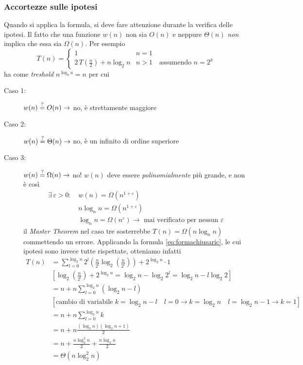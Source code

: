 \subsubsection{Accortezze sulle ipotesi}
Quando si applica la formula, si deve fare attenzione durante la verifica delle ipotesi.
Il fatto che una funzione $w(n)$ non sia $O(n)$ e neppure $\Theta(n)$ \textit{non} implica che essa sia $\Omega(n)$. Per esempio
\[
    T(n) = 
    \begin{cases} 
        1      &  n = 1 \\
        2 \, T\left(\frac{n}{2}\right) + n \log_2 n & n > 1 \quad \text{assumendo } n=2^k
    \end{cases}
\]
ha come \textit{treshold} $n^{\log_b a} = n$ per cui
\begin{description}
    \item[Caso 1:] $w(n) \overset{?}{=} O(n) \rightarrow $ no, è strettamente maggiore
    \item[Caso 2:] $w(n) \overset{?}{=} \Theta(n) \rightarrow $ no, è un infinito di ordine superiore
    \item[Caso 3:] $w(n) \overset{?}{=} \Omega(n) \rightarrow $
        no! $w(n)$ deve essere \textit{polinomialmente} più grande, e non è così
        \begin{align*}
            \exists \, \varepsilon > 0 :\, & w(n) = \Omega \left( n^{1+\varepsilon} \right) \\
            & n \log_n n = \Omega \left( n^{1+\varepsilon} \right) \\
            & \log_n n = \Omega \left( n^{\varepsilon} \right) \rightarrow
                \text{ mai verificato per nessun $\varepsilon$}
        \end{align*}
        il \textit{Master Theorem} nel caso tre sosterrebbe $T(n)=\Omega \left( n \log_n n \right)$
        commettendo un errore. Applicando la formula \ref{eq:formachiusaric}, le cui ipotesi sono invece tutte rispettate, otteniamo infatti
        \begin{align*}
            T(n) &= \sum_{l=0}^{\log_2 n} 2^l \left( \frac{n}{2^l} \log_2 \left( \frac{n}{2^l} \right) \right) + 2^{\log_2 n} \cdot 1 \\
            & \left[ \log_2 \left( \frac{n}{2^l} \right) + 2^{\log_2 n} = \log_2 n - \log_2 2^l = \log_2 n - l \log_2 2 \right] \\
            & = n + n \sum_{l=0}^{\log_2 n} \left( \log_2 n - l \right) \\
            & \left[ \text{cambio di variabile } k = \log_2n-l \quad
                l=0 \rightarrow k=\log_2 n \quad l=\log_2 n -1 \rightarrow k=1 \right] \\
            & = n + n \sum_{l=0}^{\log_2 n} k \\
            & = n + n \frac{\left( \log_2 n \right) \left( \log_2 n + 1 \right)}{2} \\
            & = n + \frac{n \log_2^2 n }{2}  + \frac{n \log_2 n }{2} \\
            & = \Theta \left( n \log_2^2 n \right) 
        \end{align*}
\end{description}

